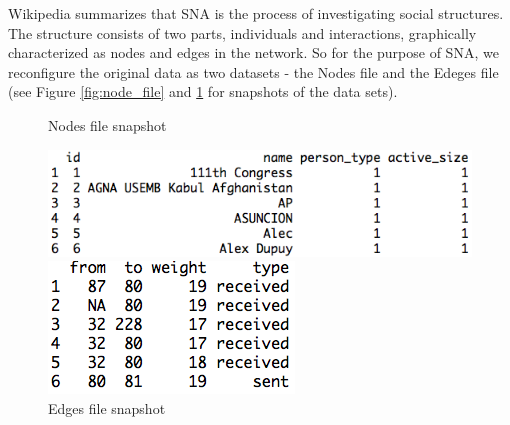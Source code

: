 Wikipedia summarizes that SNA  is the process of investigating social structures\cite{wiki_sna}. The structure consists of two parts, individuals and interactions, graphically characterized as nodes and edges in the network. So for the purpose of SNA, we reconfigure the original data as two datasets - the Nodes file and the Edeges file (see Figure \ref{fig:node_file} and \ref{fig:edge_file} for snapshots of the data sets).
\begin{figure}[ht]
\caption{Nodes file snapshot}
\label{fig:node_file}
\centering
\includegraphics[width=.68\textwidth]{report_node_file}

\caption{Edges file snapshot}
\label{fig:edge_file}
\centering
\includegraphics[width=.35\textwidth]{report_edge_file}
\end{figure}